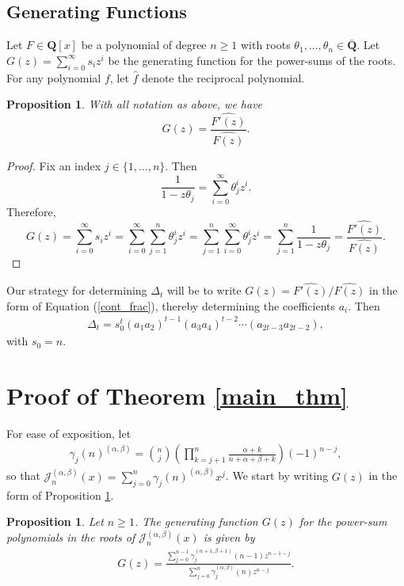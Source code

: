 \documentclass[10pt,a4paper]{amsart}
\newcommand{\Q}{\mathbf{Q}}
\newtheorem{prop}[equation]{Proposition}
\begin{document}
\subsection{Generating Functions}

Let $F \in \Q[x]$ be a polynomial of degree $n \geq 1$ with roots $\theta_1,\dots,\theta_n \in \overline{\Q}$.  Let $G(z) = \sum_{i=0}^\infty s_iz^i$ be the generating function for the power-sums of the roots.  For any polynomial $f$, let $\widehat{f}$ denote the reciprocal polynomial.

\begin{prop} \label{G_deriv_prop}
With all notation as above, we have
\[
G(z) = \frac{\widehat{F'(z)}}{\widehat{F(z)}}.
\]
\end{prop}

\begin{proof}
Fix an index $j \in \lbrace 1,\dots,n \rbrace$.  Then
\[
\frac{1}{1-z\theta_j} = \sum_{i=0}^\infty \theta_j^iz^i.
\]
Therefore, 
\[
G(z) = \sum_{i=0}^\infty s_iz^i = \sum_{i=0}^\infty \sum_{j=1}^n \theta_j^i z^i = \sum_{j=1}^n \sum_{i=0}^\infty \theta_j^iz^i= \sum_{j=1}^n \frac{1}{1-z\theta_j} =  \frac{\widehat{F'(z)}}{\widehat{F(z)}}.
\]
\end{proof}

Our strategy for determining $\Delta_t$ will be to write $G(z) = {\widehat{F'(z)}}/{\widehat{F(z)}}$ in the form of Equation (\ref{cont_frac}), thereby determining the coefficients $a_i$. Then
\begin{align} \label{det_k}
\Delta_{t} = s_0^t \left( a_1a_2 \right)^{t-1}\left(a_3a_4 \right)^{t-2} \cdots \left(a_{2t-3}a_{2t-2}\right),
\end{align}
with $s_0=n$.

\section{Proof of Theorem \ref{main_thm}}

For ease of exposition, let 
\begin{align} \label{gamma_defn}
\gamma_j(n)^{(\alpha,\beta)} = \binom{n}{j} \left( \prod_{k=j+1}^n \frac{\alpha + k}{n+\alpha + \beta + k} \right) (-1)^{n-j},
\end{align}
so that $\mathscr{J}_n^{(\alpha,\beta)}(x) = \sum_{j=0}^n\gamma_j(n)^{(\alpha,\beta)}x^j$. We start by writing $G(z)$ in the form of Proposition \ref{G_deriv_prop}.  


\begin{prop}\label{gen_function}
Let $n \geq 1$.  The generating function $G(z)$ for the power-sum polynomials in the roots of $\mathscr{J}_n^{(\alpha,\beta)}(x)$ is given by
\begin{align}  \label{F_eq_original}
G(z) =\frac{\sum_{j=0}^{n-1} \gamma_j^{(\alpha+1,\beta+1)}(n-1)z^{n-1-j}}{\sum_{j=0}^n \gamma_j^{(\alpha,\beta)}(n)z^{n-j}}.
\end{align}
\end{prop}
\end{document}
